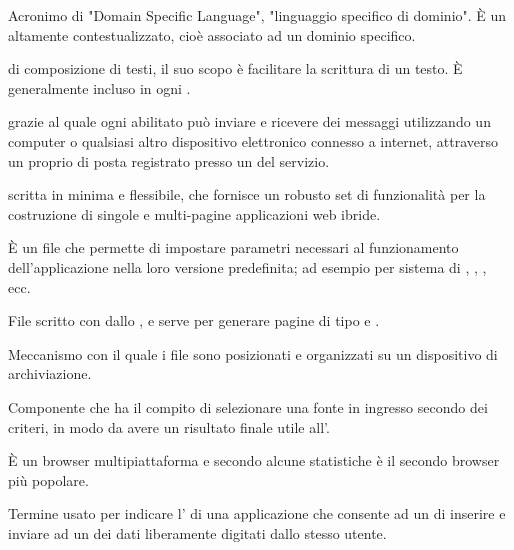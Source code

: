 {Acronimo di "Domain Specific Language", "linguaggio specifico di dominio". \`{E} un  altamente contestualizzato, cioè associato ad un dominio specifico.} 




{ di composizione di testi, il suo scopo è facilitare la scrittura di un testo. \`{E} generalmente incluso in ogni .}


{  grazie al quale ogni  abilitato può inviare e ricevere dei messaggi utilizzando un computer o qualsiasi altro dispositivo elettronico connesso a internet, attraverso un proprio  di posta registrato presso un  del servizio.}


{ scritta in  minima e flessibile, che fornisce un robusto set di funzionalità per la costruzione di singole e multi-pagine applicazioni web ibride.}



{\`{E} un file che permette di impostare parametri necessari al funzionamento dell'applicazione nella loro versione predefinita; ad esempio  per sistema di , , , ecc.}



{File scritto con   dallo , e serve per generare pagine di tipo  e .}





{Meccanismo con il quale i file sono posizionati e organizzati su un dispositivo di archiviazione.}


{Componente che ha il compito di selezionare una fonte in ingresso secondo dei criteri, in modo da avere un risultato finale utile all'.}


{\`{E} un browser  multipiattaforma e secondo alcune statistiche è il secondo browser più popolare.}


{Termine usato per indicare l' di una applicazione che consente ad un  di inserire e inviare ad un  dei dati liberamente digitati dallo stesso utente.}



